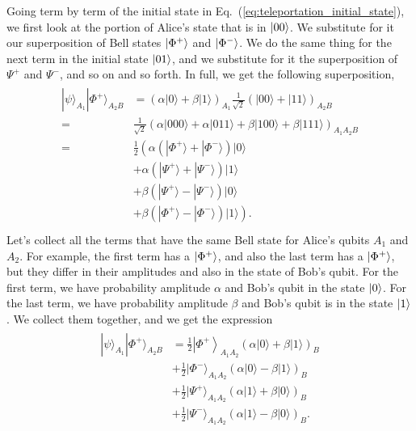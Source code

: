 Going term by term of the initial state in Eq.~(\ref{eq:teleportation_initial_state}), we first look at the portion of Alice's state that is in $\left| 00 \right\rangle$.
We substitute for it our superposition of Bell states $\left| \Phi^+ \right\rangle$ and $\left| \Phi^- \right\rangle$.
We do the same thing for the next term in the initial state $\left| 01 \right\rangle$, and we substitute for it the superposition of $\Psi^+$ and $\Psi^-$, and so on and so forth.
In full, we get the following superposition,
\begin{align}
    \begin{aligned}
        |\psi\rangle_{A_{1}}|\Phi^{+}\rangle_{A_{2} B} & = (\alpha|0\rangle+\beta|1\rangle)_{A_{1}} \frac{1}{\sqrt{2}}(|00\rangle+|11\rangle)_{A_{2} B} \\
        = & \frac{1}{\sqrt{2}}(\alpha|000\rangle+\alpha|011\rangle+\beta|100\rangle+\beta|111\rangle)_{A_{1} A_{2} B} \\
        = & \frac{1}{2}\left( \alpha\left(|\Phi^{+}\rangle+|\Phi^{-}\rangle\right)|0\rangle\right.\\
        & + \alpha\left(|\Psi^{+}\rangle+|\Psi^{-}\rangle\right)|1\rangle \\
        & + \beta\left(|\Psi^{+}\rangle-|\Psi^{-}\rangle\right)|0\rangle \\
        & \left. +\beta\left(|\Phi^{+}\rangle-|\Phi^{-}\rangle\right)|1\rangle\right). \\
\end{aligned}
\end{align}
Let's collect all the terms that have the same Bell state for Alice's qubits $A_1$ and $A_2$.
For example, the first term has a $\left| \Phi^+ \right\rangle$, and also the last term has a $\left| \Phi^+ \right\rangle$, but they differ in their amplitudes and also in the state of Bob's qubit.
For the first term, we have probability amplitude $\alpha$ and Bob's qubit in the state $\left| 0 \right\rangle$.
For the last term, we have probability amplitude $\beta$ and Bob's qubit is in the state $\left| 1 \right\rangle$.
We collect them together, and we get the expression
\begin{align}
\begin{aligned}
    |\psi\rangle_{A_{1}}|\Phi^{+}\rangle_{A_{2} B} & = \frac{1}{2}\left|\Phi^{+}\right\rangle_{A_{1} A_{2}}(\alpha|0\rangle+\beta|1\rangle)_{B} \\
    & + \frac{1}{2}|\Phi^{-}\rangle_{A_{1} A_{2}}(\alpha|0\rangle-\beta|1\rangle)_{B} \\
    & + \frac{1}{2}|\Psi^{+}\rangle_{A_{1} A_{2}}(\alpha|1\rangle+\beta|0\rangle)_{B} \\
    & + \frac{1}{2}|\Psi^{-}\rangle_{A_{1} A_{2}}(\alpha|1\rangle-\beta|0\rangle)_{B}.
\end{aligned}
\label{eq:teleport-alice-basis}
\end{align}

